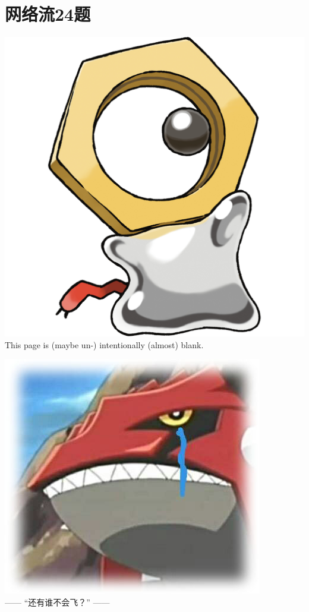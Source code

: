 \section{网络流24题}
    \noindent
    \begin{center}
        \vfill
        \vfill
        \includegraphics[scale=0.2]{pictures/Meltan.png}
        \vfill
        This page is (maybe un-) intentionally (almost) blank.
        \vfill
    \end{center}
    

\pagebreak
\hspace{0pt}
\centering
\vfill
\includegraphics[scale=0.4]{pictures/Groudon.jpg}\\[0.4cm]
------ “还有谁不会飞？” ------
\vfill
\hspace{0pt}
\pagebreak
